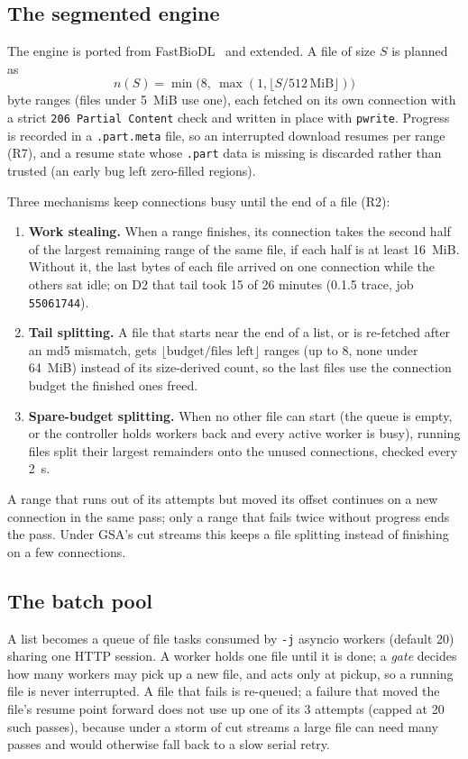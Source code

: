 \documentclass[11pt,a4paper]{article}
\newcommand{\code}[1]{\texttt{#1}}
\begin{document}
\subsection{The segmented engine}
\label{sec:engine}
The engine is ported from FastBioDL~\cite{fastbiodl} and extended. A file of size $S$ is planned as
\[ n(S) = \min\bigl(8,\ \max(1, \lfloor S / 512\,\text{MiB}\rfloor)\bigr) \]
byte ranges (files under 5~MiB use one), each fetched on its own connection with a strict \code{206 Partial Content} check and written in place with \code{pwrite}. Progress is
recorded in a \code{.part.meta} file, so an interrupted download resumes per range (R7), and a resume state whose
\code{.part} data is missing is discarded rather than trusted (an early bug left zero-filled regions).

Three mechanisms keep connections busy until the end of a file (R2):
\begin{enumerate}
\item \textbf{Work stealing.} When a range finishes, its connection takes the second half of the largest remaining
range of the same file, if each half is at least 16~MiB. Without it, the last bytes of each file arrived on one
connection while the others sat idle; on D2 that tail took 15 of 26 minutes (0.1.5 trace, job \code{55061744}).
\item \textbf{Tail splitting.} A file that starts near the end of a list, or is re-fetched after an md5 mismatch,
gets $\lfloor \text{budget}/\text{files left}\rfloor$ ranges (up to 8, none under 64~MiB) instead of its
size-derived count, so the last files use the connection budget the finished ones freed.
\item \textbf{Spare-budget splitting.} When no other file can start (the queue is empty, or the controller holds
workers back and every active worker is busy), running files split their largest remainders onto the unused
connections, checked every 2~s.
\end{enumerate}
A range that runs out of its attempts but moved its offset continues on a new connection in the same pass; only a
range that fails twice without progress ends the pass. Under GSA's cut streams this keeps a file splitting instead of
finishing on a few connections.

\subsection{The batch pool}
A list becomes a queue of file tasks consumed by \code{-j} asyncio workers (default 20) sharing one HTTP session. A
worker holds one file until it is done; a \emph{gate} decides how many workers may pick up a new file, and acts only at
pickup, so a running file is never interrupted. A file that fails is re-queued; a failure that moved the file's resume
point forward does not use up one of its 3 attempts (capped at 20 such passes), because under a storm of cut streams
a large file can need many passes and would otherwise fall back to a slow serial retry.
\end{document}
